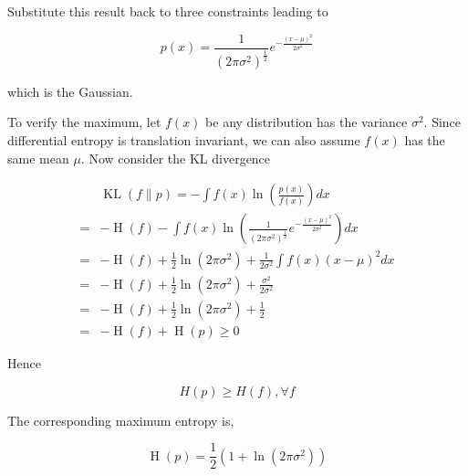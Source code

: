 \documentclass{article}
\begin{document}
            Substitute this result back to three constraints leading to

            \begin{equation*}
                 p(x) = \frac{1}{ (2 \pi \sigma^2)^{\frac{1}{2}} } e^{ -\frac{(x - \mu)^2}{2 \sigma^2} }
            \end{equation*}

            which is the Gaussian.

            To verify the maximum, let $ f(x) $ be any distribution has the
            variance $ \sigma^2 $. Since differential entropy is translation invariant, we can also assume
            $ f(x) $ has the same mean $ \mu $. Now consider the KL divergence

            \begin{align*}
                & \operatorname{KL}(f \| p) = -\int f(x) \ln \left( \frac{p(x)}{f(x)} \right) dx \\
                =& -\operatorname{H}(f) - \int f(x) \ln \left(
                         \frac{1}{ (2 \pi \sigma^2)^{\frac{1}{2}} }
                         e^{ -\frac{(x - \mu)^2}{2 \sigma^2} } 
                    \right) dx                                                                   \\
                =& -\operatorname{H}(f) + \frac{1}{2} \ln (2 \pi \sigma^{2}) +
                    \frac{1}{2 \sigma^{2}} \int f(x) (x - \mu)^{2} dx                            \\
                =& -\operatorname{H}(f) + \frac{1}{2} \ln (2 \pi \sigma^{2}) +
                    \frac{\sigma^{2}}{2 \sigma^{2}}                                              \\
                =& -\operatorname{H}(f) + \frac{1}{2} \ln (2 \pi \sigma^{2}) + \frac{1}{2}       \\
                =& -\operatorname{H}(f) + \operatorname{H}(p) \geq 0
            \end{align*}

            Hence

            \begin{equation*}
                 H(p) \geq H(f), \forall f
            \end{equation*}

            The corresponding maximum entropy is,

            \begin{equation*}
                 \operatorname{H}(p) = \frac{1}{2} (1 + \ln(2 \pi \sigma^2))
            \end{equation*}
\end{document}
